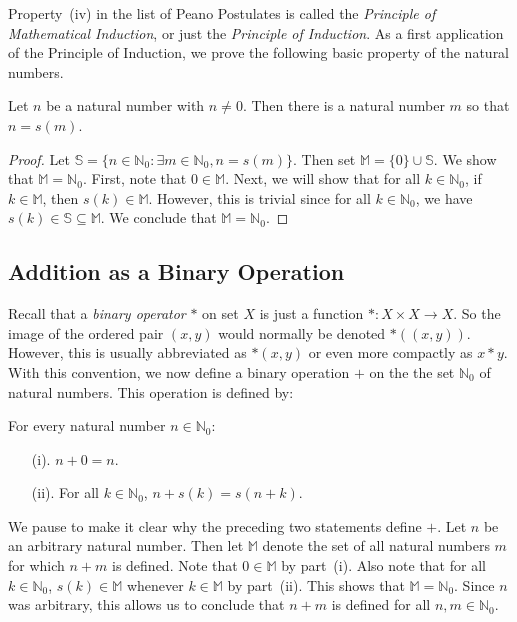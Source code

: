 Property~(iv) in the list of Peano Postulates is called 
the \textit{Principle of Mathematical Induction}, or
just the \textit{Principle of Induction}.
As a first application of the Principle of Induction, we prove the following
basic property of the natural numbers.

\begin{proposition}
Let $n$ be a natural number with $n\neq0$.  Then there is a
natural number $m$ so that $n=s(m)$.
\end{proposition}
\begin{proof}
Let $\mathbb{S}=\{n\in\mathbb{N}_0:\exists m\in\mathbb{N}_0,
n=s(m)\}$.  Then set $\mathbb{M}=\{0\}\cup\mathbb{S}$.
We show that $\mathbb{M}=\mathbb{N}_0$.  First, note that
$0\in\mathbb{M}$.  Next, we will show that for all $k\in\mathbb{N}_0$,
if $k\in\mathbb{M}$, then $s(k)\in\mathbb{M}$. However, this is trivial
since for all $k\in\mathbb{N}_0$, we have 
$s(k)\in\mathbb{S}\subseteq\mathbb{M}$.
We conclude that $\mathbb{M}=\mathbb{N}_0$.
\end{proof}

\subsection{Addition as a Binary Operation}\label{s:add}

Recall that a \textit{binary operator} $*$ on set $X$ is just
a function $*:X\times X\rightarrow X$.  So the image of
the ordered pair $(x,y)$ would normally be denoted $*((x,y))$.
However, this is usually abbreviated as $*(x,y)$ or
even more compactly as $x*y$.  With this convention,
we now define a binary operation $+$ 
on the the set $\mathbb{N}_0$ of natural numbers.
This operation is defined by:

For every natural number $n\in\mathbb{N}_0$:
\begin{enumerate}
\item [(i).]  $n+0=n$.
\item [(ii).] For all $k\in\mathbb{N}_0$, $n+s(k) = s(n+k)$.
\end{enumerate}

We pause to make it clear why the preceding two statements
define $+$.  Let $n$ be
an arbitrary natural number.  Then let $\mathbb{M}$ denote the
set of all natural numbers $m$ for which $n+m$ is
defined.  Note that $0\in \mathbb{M}$ by part~(i).  Also note
that for all $k\in \mathbb{N}_0$, $s(k)\in \mathbb{M}$ whenever 
$k\in \mathbb{M}$ by part~(ii).  This
shows that $\mathbb{M}=\mathbb{N}_0$.  Since $n$ was arbitrary, this allows us
to conclude that $n+m$ is defined for all $n,m\in \mathbb{N}_0$.

